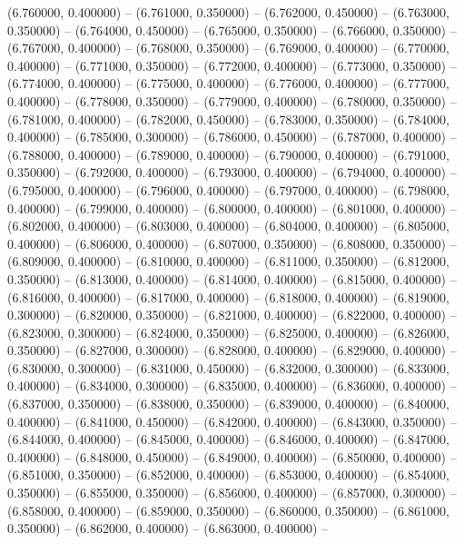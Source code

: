(6.760000, 0.400000) -- 
(6.761000, 0.350000) -- 
(6.762000, 0.450000) -- 
(6.763000, 0.350000) -- 
(6.764000, 0.450000) -- 
(6.765000, 0.350000) -- 
(6.766000, 0.350000) -- 
(6.767000, 0.400000) -- 
(6.768000, 0.350000) -- 
(6.769000, 0.400000) -- 
(6.770000, 0.400000) -- 
(6.771000, 0.350000) -- 
(6.772000, 0.400000) -- 
(6.773000, 0.350000) -- 
(6.774000, 0.400000) -- 
(6.775000, 0.400000) -- 
(6.776000, 0.400000) -- 
(6.777000, 0.400000) -- 
(6.778000, 0.350000) -- 
(6.779000, 0.400000) -- 
(6.780000, 0.350000) -- 
(6.781000, 0.400000) -- 
(6.782000, 0.450000) -- 
(6.783000, 0.350000) -- 
(6.784000, 0.400000) -- 
(6.785000, 0.300000) -- 
(6.786000, 0.450000) -- 
(6.787000, 0.400000) -- 
(6.788000, 0.400000) -- 
(6.789000, 0.400000) -- 
(6.790000, 0.400000) -- 
(6.791000, 0.350000) -- 
(6.792000, 0.400000) -- 
(6.793000, 0.400000) -- 
(6.794000, 0.400000) -- 
(6.795000, 0.400000) -- 
(6.796000, 0.400000) -- 
(6.797000, 0.400000) -- 
(6.798000, 0.400000) -- 
(6.799000, 0.400000) -- 
(6.800000, 0.400000) -- 
(6.801000, 0.400000) -- 
(6.802000, 0.400000) -- 
(6.803000, 0.400000) -- 
(6.804000, 0.400000) -- 
(6.805000, 0.400000) -- 
(6.806000, 0.400000) -- 
(6.807000, 0.350000) -- 
(6.808000, 0.350000) -- 
(6.809000, 0.400000) -- 
(6.810000, 0.400000) -- 
(6.811000, 0.350000) -- 
(6.812000, 0.350000) -- 
(6.813000, 0.400000) -- 
(6.814000, 0.400000) -- 
(6.815000, 0.400000) -- 
(6.816000, 0.400000) -- 
(6.817000, 0.400000) -- 
(6.818000, 0.400000) -- 
(6.819000, 0.300000) -- 
(6.820000, 0.350000) -- 
(6.821000, 0.400000) -- 
(6.822000, 0.400000) -- 
(6.823000, 0.300000) -- 
(6.824000, 0.350000) -- 
(6.825000, 0.400000) -- 
(6.826000, 0.350000) -- 
(6.827000, 0.300000) -- 
(6.828000, 0.400000) -- 
(6.829000, 0.400000) -- 
(6.830000, 0.300000) -- 
(6.831000, 0.450000) -- 
(6.832000, 0.300000) -- 
(6.833000, 0.400000) -- 
(6.834000, 0.300000) -- 
(6.835000, 0.400000) -- 
(6.836000, 0.400000) -- 
(6.837000, 0.350000) -- 
(6.838000, 0.350000) -- 
(6.839000, 0.400000) -- 
(6.840000, 0.400000) -- 
(6.841000, 0.450000) -- 
(6.842000, 0.400000) -- 
(6.843000, 0.350000) -- 
(6.844000, 0.400000) -- 
(6.845000, 0.400000) -- 
(6.846000, 0.400000) -- 
(6.847000, 0.400000) -- 
(6.848000, 0.450000) -- 
(6.849000, 0.400000) -- 
(6.850000, 0.400000) -- 
(6.851000, 0.350000) -- 
(6.852000, 0.400000) -- 
(6.853000, 0.400000) -- 
(6.854000, 0.350000) -- 
(6.855000, 0.350000) -- 
(6.856000, 0.400000) -- 
(6.857000, 0.300000) -- 
(6.858000, 0.400000) -- 
(6.859000, 0.350000) -- 
(6.860000, 0.350000) -- 
(6.861000, 0.350000) -- 
(6.862000, 0.400000) -- 
(6.863000, 0.400000) -- 
